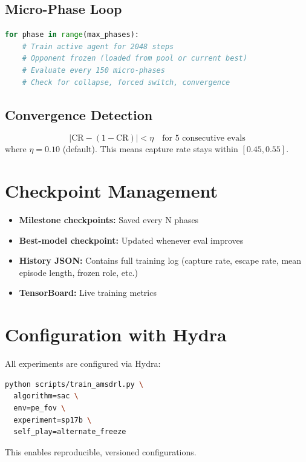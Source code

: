 \documentclass[11pt,a4paper]{report}
\begin{document}
\subsection{Micro-Phase Loop}
\begin{lstlisting}[language=Python]
for phase in range(max_phases):
    # Train active agent for 2048 steps
    # Opponent frozen (loaded from pool or current best)
    # Evaluate every 150 micro-phases
    # Check for collapse, forced switch, convergence
\end{lstlisting}

\subsection{Convergence Detection}
\begin{equation}
    |\text{CR} - (1 - \text{CR})| < \eta \quad \text{for 5 consecutive evals}
\end{equation}
where $\eta = 0.10$ (default). This means capture rate stays within $[0.45, 0.55]$.

\section{Checkpoint Management}

\begin{itemize}
    \item \textbf{Milestone checkpoints:} Saved every N phases
    \item \textbf{Best-model checkpoint:} Updated whenever eval improves
    \item \textbf{History JSON:} Contains full training log (capture rate, escape rate, mean episode length, frozen role, etc.)
    \item \textbf{TensorBoard:} Live training metrics
\end{itemize}

\section{Configuration with Hydra}

All experiments are configured via Hydra:
\begin{lstlisting}[language=bash]
python scripts/train_amsdrl.py \
  algorithm=sac \
  env=pe_fov \
  experiment=sp17b \
  self_play=alternate_freeze
\end{lstlisting}

This enables reproducible, versioned configurations.
\end{document}
